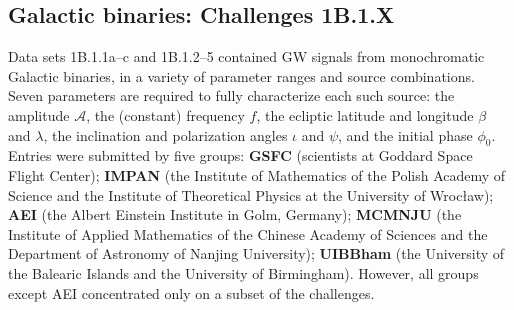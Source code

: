 \documentclass{iopart}
\begin{document}
\subsection{Galactic binaries: Challenges 1B.1.X}

Data sets 1B.1.1a--c and 1B.1.2--5 contained GW signals from monochromatic Galactic binaries, in a variety of parameter ranges and source combinations. Seven parameters are required to fully characterize each such source: the amplitude $\mathcal{A}$, the (constant) frequency $f$, the ecliptic latitude and longitude $\beta$ and $\lambda$, the inclination and polarization angles $\iota$ and $\psi$, and the initial phase $\phi_0$. Entries were submitted by five groups: \textbf{GSFC} (scientists at Goddard Space Flight Center); \textbf{IMPAN} (the Institute of Mathematics of the Polish Academy of Science and the Institute of Theoretical Physics at the University of Wroc{\l}aw); \textbf{AEI} (the Albert Einstein Institute in Golm, Germany); \textbf{MCMNJU} (the Institute of Applied Mathematics of the Chinese Academy of Sciences and the Department of Astronomy of Nanjing University); \textbf{UIBBham} (the University of the Balearic Islands and the University of Birmingham). However, all groups except AEI concentrated only on a subset of the challenges.
\end{document}
